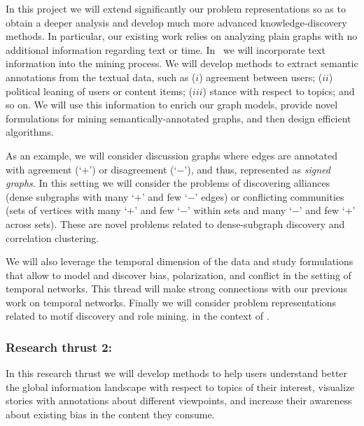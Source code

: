 \documentclass[a4paper,11pt]{article}
\begin{document}
\smallskip
In this project we will extend significantly our problem representations
so as to obtain a deeper analysis and develop much more advanced knowledge-discovery methods.
In particular, our existing work relies on analyzing plain graphs
with no additional information regarding text or time. 
In \acronym\ we will incorporate text information into the mining process.
We will develop methods to extract semantic annotations from the textual data, 
such as
($i$) agreement between users; 
($ii$) political leaning of users or content items; 
($iii$) stance with respect to topics; 
and so on.
We will use this information to enrich our graph models,
provide novel formulations for mining semantically-annotated graphs, 
and then design efficient algorithms.

\smallskip
As an example, we will consider discussion graphs
where edges are annotated with agreement (`$+$') or disagreement (`$-$'), 
and thus, represented as {\em signed graphs}.
In this setting we will consider the problems of discovering alliances 
(dense subgraphs with many `$+$' and few `$-$' edges) 
or conflicting communities
(sets of vertices with many `$+$' and few `$-$' within sets and many `$-$' and few `$+$' across sets). 
These are novel problems related to dense-subgraph discovery
and correlation clustering. %

\smallskip
We will also leverage the temporal dimension of the data
and study formulations that allow to model and discover 
bias, polarization, and conflict in the setting of temporal networks.
This thread will make strong connections with our previous work on 
temporal networks.
Finally we will consider problem representations  
related to motif discovery
and role mining.
in the context of \acronym.

\subsubsection*{Research thrust 2: \explore}

\noindent
\hspace{-3mm}\colorbox{verylightmagenta}{
\begin{minipage}{\textwidth}
In this research thrust we will develop methods to help users 
understand better the global information landscape with respect to topics of their interest, 
visualize stories with annotations about different viewpoints, and 
increase their awareness about existing bias in the content they consume.
\end{minipage}}
\end{document}
